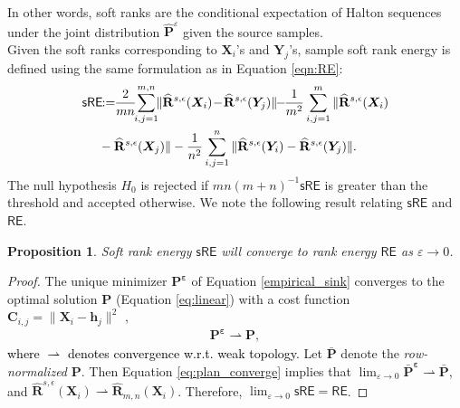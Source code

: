 \documentclass{article}
\newtheorem{proposition}{Proposition}
\begin{document}
In other words, soft ranks are the conditional expectation of Halton sequences under the joint distribution $\mathbf{\widehat P}^\varepsilon$ given the source samples. \\
Given the soft ranks corresponding to $\bm X_i$'s and $\bm Y_j$'s, sample soft rank energy is defined using the same formulation as in Equation \eqref{eqn:RE}:  
{\small  
  \setlength{\abovedisplayskip}{3pt}
  \setlength{\belowdisplayskip}{\abovedisplayskip}
  \setlength{\abovedisplayshortskip}{0pt}
  \setlength{\belowdisplayshortskip}{3pt}
\begin{align}
   \mathsf{sRE}\!\! &:= \!\!\frac{2}{mn}\!\! \sum_{i, j=1}^{m, n} \!\!\|\widehat{\mathbf{R}}^{s,\epsilon}(\bm X_i)\! -\!\widehat{\mathbf{R}}^{s,\epsilon}(\bm Y_j)\| \!\! - \!\!\frac{1}{m^2} \sum_{i, j=1}^{m} \|\widehat{\mathbf{R}}^{s,\epsilon}(\bm X_i) \notag \\&- \widehat{\mathbf{R}}^{s,\epsilon}(\bm X_j)\| -
    \frac{1}{n^2} \sum_{i, j=1}^{n} \|\widehat{\mathbf{R}}^{s,\epsilon}(\bm Y_i) - \widehat{\mathbf{R}}^{s,\epsilon}(\bm Y_j)\|.
\end{align}
}%
The null hypothesis $H_0$ is rejected if {\small $mn(m+n)^{-1}\mathsf{sRE}$} is greater than the threshold and accepted otherwise. We note the following result relating $\mathsf{sRE}$ and $\mathsf{RE}$.
\begin{proposition}\label{proposition1}
Soft rank energy $\mathsf{sRE}$ will converge to rank energy $\mathsf{ RE}$ as $\varepsilon\rightarrow 0$.
\end{proposition}
\begin{proof}
The unique minimizer $\mathbf{P^\varepsilon}$ of Equation \eqref{empirical_sink} converges to the optimal solution $\mathbf{P}$ (Equation \ref{eq:linear}) with a cost function $\mathbf C_{i,j}=\|\bm X_i-\bm h_j\|^2$ \cite{carlier2017convergence}, 
{\small  
  \setlength{\abovedisplayskip}{3pt}
  \setlength{\belowdisplayskip}{\abovedisplayskip}
  \setlength{\abovedisplayshortskip}{0pt}
  \setlength{\belowdisplayshortskip}{3pt}
\begin{align}\label{eq:plan_converge}
 \mathbf{P^\varepsilon}\rightharpoonup \mathbf{P},
\end{align}
}%
\textcolor{black}{where $\rightharpoonup$ denotes convergence w.r.t. weak topology.}
Let $\bar{\mathbf P}$ denote the \textit{row-normalized} $\mathbf P$. Then Equation \eqref{eq:plan_converge} implies that {\small $\lim_{\varepsilon\rightarrow 0}\mathbf{\bar P^\varepsilon}\rightharpoonup \mathbf{\bar P}$}, and {\small $\widehat{\mathbf{R}}^{s,\epsilon}(\bm X_i)\rightharpoonup\widehat{\mathbf{R}}_{m,n}(\bm{X}_i)$}. Therefore, {\small $\lim_{\varepsilon\rightarrow 0}\mathsf{sRE} = \mathsf{ RE}$}.

\end{proof}
\end{document}
